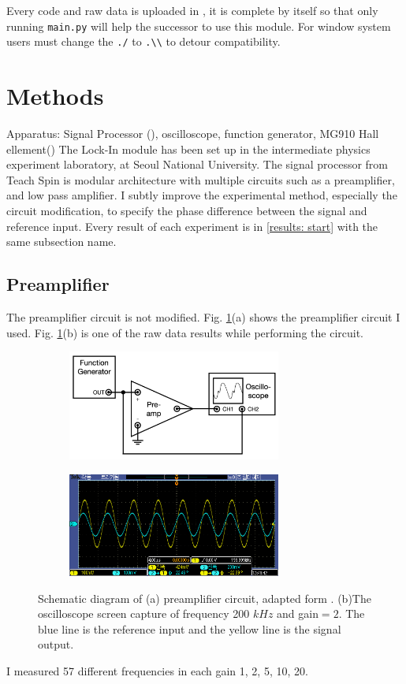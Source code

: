 \documentclass{article}
\begin{document}
 Every code and raw data is uploaded in \cite{github}, it is complete by itself so that only running \verb|main.py| will help the successor to use this module.
 For window system users must change the \verb|./| to \verb|.\\| to detour compatibility.

\section{Methods}
\label{methods: start}
Apparatus: Signal Processor (\cite{signal_processor}), oscilloscope, function generator, MG910 Hall ellement(\cite{hall_sensor})
The Lock-In module has been set up in the intermediate physics experiment laboratory, at Seoul National University.
The signal processor from Teach Spin is modular architecture with multiple circuits such as a preamplifier, and low pass amplifier.
I subtly improve the experimental method, especially the circuit modification, to specify the phase difference between the signal and reference input.
Every result of each experiment is in \ref{results: start} with the same subsection name.

\subsection{Preamplifier}
 The preamplifier circuit is not modified.
 Fig. \ref{fig: preamplifier_circuit}(a) shows the preamplifier circuit I used.
 Fig. \ref{fig: preamplifier_circuit}(b) is one of the raw data results while performing the circuit.

 \begin{figure}[ht]
  \centering
  \begin{subfigure}[b]{7cm}
      \centering
      \includegraphics[width=7cm]{../results/preamplifier_circuit.png}
      \caption{}
  \end{subfigure}
  \hfill
  \begin{subfigure}[b]{7cm}
      \centering
      \includegraphics[width=7cm]{../raw_data/TEK00071.PNG}
      \caption{}
  \end{subfigure}
  \hfill
  \caption{Schematic diagram of (a) preamplifier circuit, adapted form  \cite{signal_processor}.
  (b)The oscilloscope screen capture of frequency 200 $kHz$ and gain$=2$.
  The blue line is the reference input and the yellow line is the signal output.}
  \label{fig: preamplifier_circuit}
\end{figure}
 I measured 57 different frequencies in each gain 1, 2, 5, 10, 20.
\end{document}
